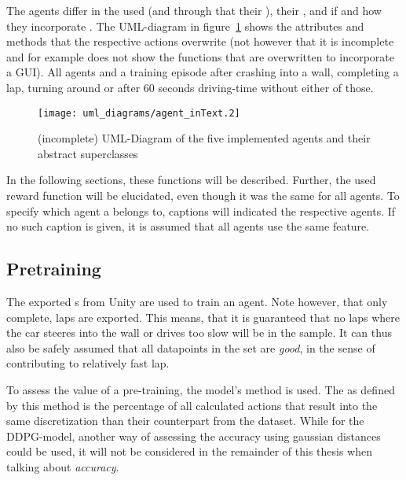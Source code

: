 The agents differ in the used  (and through that their ), their , and if and how they incorporate . The UML-diagram in figure~\ref{fig:umlAgents} shows the attributes and methods that the respective actions overwrite (not however that it is incomplete and for example does not show the functions that are overwritten to incorporate a GUI). All agents and a training episode after crashing into a wall, completing a lap, turning around or after $60$ seconds driving-time without either of those.

\begin{figure}[h]
	\centering 
	\texttt{[image: uml\_diagrams/agent\_inText.2]}  
	\caption[UML-Diagram of the implemented agents and their superclasses]{(incomplete) UML-Diagram of the five implemented agents and their abstract superclasses}
	\label{fig:umlAgents}
\end{figure}

In the following sections, these functions will be described. Further, the used reward function will be elucidated, even though it was the same for all agents. To specify which agent a  belongs to, captions will indicated the respective agents. If no such caption is given, it is assumed that all agents use the same feature.

\subsection{Pretraining}

\label{sec:pretrainingcode}

The exported s from Unity are used to train an agent. Note however, that only complete,  laps are exported. This means, that it is guaranteed that no laps where the car steeres into the wall or drives too slow will be in the sample. It can thus also be safely assumed that all datapoints in the set are \textit{good}, in the sense of contributing to relatively fast lap. 

To assess the value of a pre-training, the model's method  is used. The  as defined by this method is the percentage of all calculated actions that result into the same discretization than their counterpart from the dataset. While for the DDPG-model, another way of assessing the accuracy using gaussian distances could be used, it will not be considered in the remainder of this thesis when talking about \textit{accuracy}.

